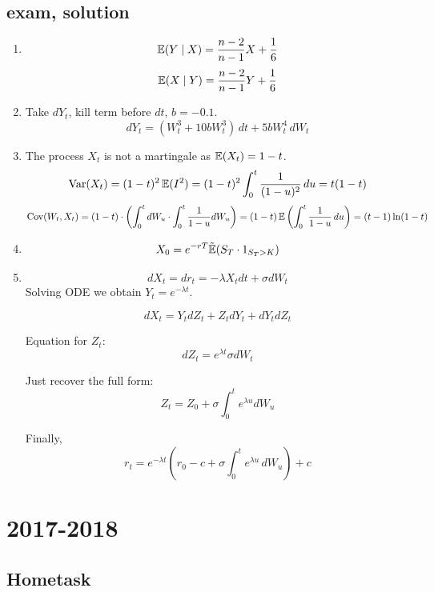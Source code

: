 \documentclass[12pt, a4paper]{article}
\begin{document}
\subsection{exam, solution}

\begin{enumerate}
\item
\[
\operatorname{\mathbb{E}}(Y \mid X) = \frac{n-2}{n-1}X + \frac{1}{6}
\]
\[
\operatorname{\mathbb{E}}(X \mid Y) = \frac{n-2}{n-1}Y + \frac{1}{6}
\]
\item Take $dY_t$, kill term before $dt$, $b=-0.1$.
\[
dY_t = (W_t^3 + 10bW_t^3) \, dt + 5bW_t^4 \, dW_t
\]
\item The process $X_t$ is not a martingale as $\operatorname{\mathbb{E}}(X_t)=1-t$.
\[
\operatorname{Var}(X_t) = (1-t)^2\operatorname{\mathbb{E}}(I^2) = (1-t)^2 \int_0^t \frac{1}{(1-u)^2} \, du = t(1-t)
\]
\[
\operatorname{Cov}(W_t, X_t) = (1-t) \cdot \left( \int_0^t dW_u \cdot \int_0^t \frac{1}{1-u}dW_u  \right) = (1-t) \operatorname{\mathbb{E}}\left( \int_0^t \frac{1}{1-u} \, du \right) = (t-1)\ln(1-t)
\]
\item
\[
X_0 = e^{-rT}\tilde{\operatorname{\mathbb{E}}}(S_T \cdot 1_{S_T>K})
\]
\item
\[
dX_t = dr_t = -\lambda X_t dt + \sigma dW_t
\]
Solving ODE we obtain $Y_t = e^{-\lambda t}$.

\[
dX_t = Y_t dZ_t + Z_t dY_t + dY_t dZ_t
\]

Equation for $Z_t$:
\[
dZ_t = e^{\lambda t}\sigma dW_t
\]

Just recover the full form:
\[
Z_t = Z_0 + \sigma \int_0^t e^{\lambda u} dW_u
\]

Finally,
\[
r_t = e^{-\lambda t}\left(r_0 - c + \sigma \int_0^t e^{\lambda u} \, dW_u  \right) + c
\]

\end{enumerate}






\section{2017-2018}

\subsection{Hometask}
\end{document}
